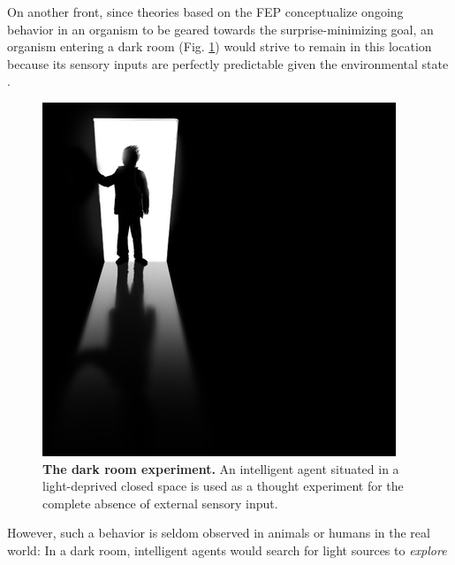 \documentclass[10pt,letterpaper]{article}
\begin{document}
On another front, since theories based on the FEP \citep{friston2010free,fristonAIorRL}
conceptualize ongoing behavior
in an organism to be geared towards the surprise-minimizing goal,
an organism entering a dark room
(Fig. \ref{fig:darkroom}) would strive to remain in this location
because its sensory inputs are perfectly predictable
given the environmental state \citep{darkroom2012}.
\begin{figure}
  \centering
  \includegraphics[width=1.\linewidth]{darkroom_resized.png}
  \caption{\textbf{The dark room experiment.} An intelligent agent situated
  in a light-deprived closed space is used
  as a thought experiment for the complete absence
  of external sensory input.
  }
  \label{fig:darkroom}
\end{figure}
However, such a behavior is seldom observed in animals or humans in the
real world: In a dark room, intelligent agents would search for light sources to \textit{explore}
\end{document}
